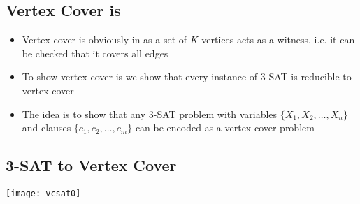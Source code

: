 
\begin{slide}
\section{Vertex Cover is }

\begin{PauseHighLight}
  \begin{itemize}
  \item Vertex cover is obviously in  as a set of $K$ vertices
    acts as a witness, i.e. it can be checked that it covers all edges\pause
  \item To show vertex cover is  we show that every
    instance of 3-SAT is reducible to vertex cover\pause
  \item The idea is to show that any 3-SAT problem with variables
    $\{X_1,X_2, \ldots,X_n\}$ and clauses $\{c_1,c_2,\ldots, c_m\}$ can
    be encoded as a vertex cover problem\pause
  \end{itemize}
\end{PauseHighLight}

\end{slide}


\begin{slide}
\section{3-SAT to Vertex Cover}

\pb
\pause
\begin{center}
  \texttt{[image: vcsat0]}
\end{center}


\end{slide}



